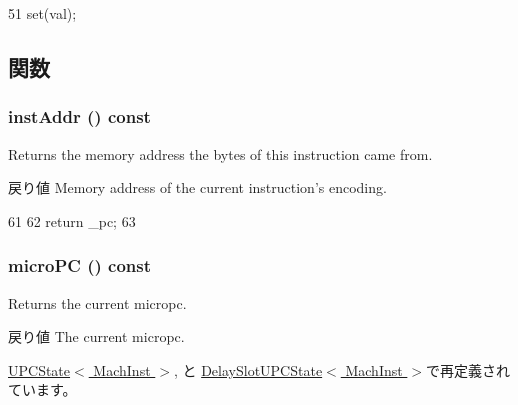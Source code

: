 \begin{DoxyCode}
51 { set(val); }
\end{DoxyCode}


\subsection{関数}
\hypertarget{classGenericISA_1_1PCStateBase_ae94f601fa23fcc26b8bbb57b896d10b5}{
\subsubsection[{instAddr}]{ instAddr () const}}
\label{classGenericISA_1_1PCStateBase_ae94f601fa23fcc26b8bbb57b896d10b5}
Returns the memory address the bytes of this instruction came from.

\begin{DoxyReturn}{戻り値}
Memory address of the current instruction's encoding. 
\end{DoxyReturn}



\begin{DoxyCode}
61     {
62         return _pc;
63     }
\end{DoxyCode}
\hypertarget{classGenericISA_1_1PCStateBase_a8f0ea0df7a63b5fbf898277c4d3a1268}{
\subsubsection[{microPC}]{ microPC () const}}
\label{classGenericISA_1_1PCStateBase_a8f0ea0df7a63b5fbf898277c4d3a1268}
Returns the current micropc.

\begin{DoxyReturn}{戻り値}
The current micropc. 
\end{DoxyReturn}


\hyperlink{classGenericISA_1_1UPCState_a8f0ea0df7a63b5fbf898277c4d3a1268}{UPCState$<$ MachInst $>$}, と \hyperlink{classGenericISA_1_1DelaySlotUPCState_a8f0ea0df7a63b5fbf898277c4d3a1268}{DelaySlotUPCState$<$ MachInst $>$}で再定義されています。


